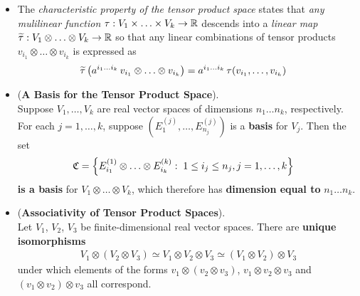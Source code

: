 \documentclass[11pt]{article}
\begin{document}
\begin{itemize}
\item \begin{remark}
The \emph{characteristic property of the tensor product space} states that \emph{any mulilinear function} $\tau: V_1\times \ldots \times V_k \rightarrow {\mathbb R}$ descends into a \emph{linear map} $\widetilde{\tau}:V_1\otimes \ldots \otimes V_k \rightarrow {\mathbb R}$ so that any linear combinations of tensor products $v_{i_1} \otimes \ldots \otimes v_{i_k}$ is expressed as
\begin{align*}
\widetilde{\tau}\left(a^{i_1\ldots i_k}\,v_{i_1} \otimes \ldots \otimes v_{i_k}\right) &= a^{i_1\ldots i_k}\,\tau(v_{i_1}, \ldots, v_{i_k})
\end{align*}
\end{remark}


\item \begin{proposition} (\textbf{A Basis for the Tensor Product Space}).\\
Suppose $V_1,\ldots,V_k$ are real vector spaces of dimensions $n_1 \ldots  n_k$, respectively. For each $j = 1,\ldots,k$, suppose $(E_1^{(j)},\ldots, E_{n_j}^{(j)})$ is a \textbf{basis} for $V_j$. Then the set
\begin{align*}
\mathfrak{C}&= \left\{E^{(1)}_{i_1} \otimes \ldots \otimes E^{(k)}_{i_k}: \; 1 \le i_j \le n_j, j=1,\ldots, k\right\}
\end{align*} \textbf{is a basis} for $V_1\otimes \ldots \otimes V_k$, which therefore has \textbf{dimension equal to} $n_1 \ldots  n_k$.
\end{proposition}

\item \begin{proposition} (\textbf{Associativity of Tensor Product Spaces}).\\
Let $V_1$, $V_2$, $V_3$ be finite-dimensional real vector spaces. There are \textbf{unique isomorphisms}
\begin{align*}
V_1 \otimes (V_2 \otimes V_3) \simeq V_1 \otimes V_2 \otimes V_3 \simeq (V_1 \otimes V_2) \otimes V_3 
\end{align*}
under which elements of the forms $v_1 \otimes (v_2 \otimes v_3)$, $v_1 \otimes v_2 \otimes v_3$ and $(v_1 \otimes v_2) \otimes v_3$ all correspond.
\end{proposition}


\end{itemize}
\end{document}
